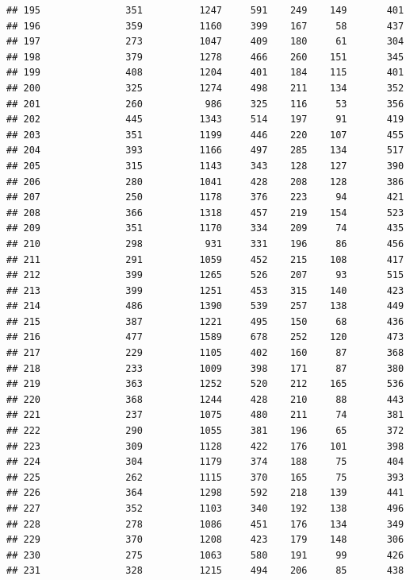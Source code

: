 \documentclass[]{book}
\begin{document}
\begin{verbatim}
## 195               351          1247     591    249    149       401
## 196               359          1160     399    167     58       437
## 197               273          1047     409    180     61       304
## 198               379          1278     466    260    151       345
## 199               408          1204     401    184    115       401
## 200               325          1274     498    211    134       352
## 201               260           986     325    116     53       356
## 202               445          1343     514    197     91       419
## 203               351          1199     446    220    107       455
## 204               393          1166     497    285    134       517
## 205               315          1143     343    128    127       390
## 206               280          1041     428    208    128       386
## 207               250          1178     376    223     94       421
## 208               366          1318     457    219    154       523
## 209               351          1170     334    209     74       435
## 210               298           931     331    196     86       456
## 211               291          1059     452    215    108       417
## 212               399          1265     526    207     93       515
## 213               399          1251     453    315    140       423
## 214               486          1390     539    257    138       449
## 215               387          1221     495    150     68       436
## 216               477          1589     678    252    120       473
## 217               229          1105     402    160     87       368
## 218               233          1009     398    171     87       380
## 219               363          1252     520    212    165       536
## 220               368          1244     428    210     88       443
## 221               237          1075     480    211     74       381
## 222               290          1055     381    196     65       372
## 223               309          1128     422    176    101       398
## 224               304          1179     374    188     75       404
## 225               262          1115     370    165     75       393
## 226               364          1298     592    218    139       441
## 227               352          1103     340    192    138       496
## 228               278          1086     451    176    134       349
## 229               370          1208     423    179    148       306
## 230               275          1063     580    191     99       426
## 231               328          1215     494    206     85       438

\end{verbatim}
\end{document}

